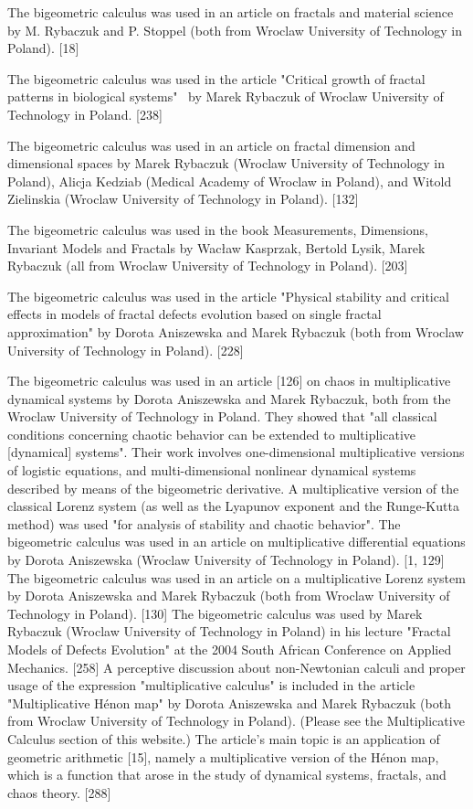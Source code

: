 \documentclass[12pt]{article}
\begin{document}
The bigeometric calculus was used in an article on fractals and material science by M. Rybaczuk and P. Stoppel (both from Wroclaw University of Technology in Poland). [18]

The bigeometric calculus was used in the article "Critical growth of fractal patterns in biological systems"  by Marek Rybaczuk of Wroclaw University of Technology in Poland. [238]

The bigeometric calculus was used in an article on fractal dimension and dimensional spaces by Marek Rybaczuk (Wroclaw University of Technology in Poland), Alicja Kedziab (Medical Academy of Wroclaw in Poland), and Witold Zielinskia (Wroclaw University of Technology in Poland). [132] 

The bigeometric calculus was used in the book Measurements, Dimensions, Invariant Models and Fractals by Wacław Kasprzak, Bertold Lysik, Marek Rybaczuk (all from Wroclaw University of Technology in Poland). [203]

The bigeometric calculus was used in the article "Physical stability and critical effects in models of fractal defects evolution based on single fractal approximation" by Dorota Aniszewska and Marek Rybaczuk (both from Wroclaw University of Technology in Poland). [228]

The bigeometric calculus was used in an article [126] on chaos in multiplicative dynamical systems by Dorota Aniszewska and Marek Rybaczuk, both from the Wroclaw University of Technology in Poland. They showed that "all classical conditions concerning chaotic behavior can be extended to multiplicative [dynamical] systems". Their work involves one-dimensional multiplicative versions of logistic equations, and multi-dimensional nonlinear dynamical systems described by means of the bigeometric derivative. A multiplicative version of the classical Lorenz system (as well as the Lyapunov exponent and the Runge-Kutta method) was used "for analysis of stability and chaotic behavior".
The bigeometric calculus was used in an article on multiplicative differential equations by Dorota Aniszewska (Wroclaw University of Technology in Poland). [1, 129]  The bigeometric calculus was used in an article on a multiplicative Lorenz system by Dorota Aniszewska and Marek Rybaczuk (both from Wroclaw University of Technology in Poland). [130]
The bigeometric calculus was used by Marek Rybaczuk (Wroclaw University of Technology in Poland) in his lecture "Fractal Models of Defects Evolution" at the 2004 South African Conference on Applied Mechanics. [258]
A perceptive discussion about non-Newtonian calculi and proper usage of the expression "multiplicative calculus" is included in the article "Multiplicative Hénon map" by Dorota Aniszewska and Marek Rybaczuk (both from Wroclaw University of Technology in Poland). (Please see the Multiplicative Calculus section of this website.) The article's main topic is an application of geometric arithmetic [15], namely a multiplicative version of the Hénon map, which is a function that arose in the study of dynamical systems, fractals, and chaos theory. [288]
\end{document}
